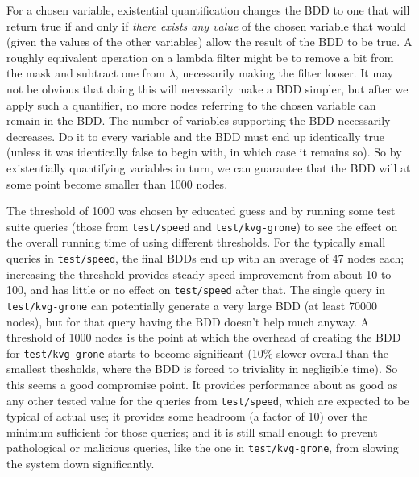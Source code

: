 \documentclass[twocolumn]{report}
\begin{document}
For a chosen variable, existential quantification changes the BDD to one
that will return true if and only if \emph{there exists any value} of the
chosen variable that would (given the values of the other variables) allow
the result of the BDD to be true.  A roughly equivalent operation on a
lambda filter might be to remove a bit from the mask and subtract one from
$\lambda$, necessarily making the filter looser.  It may not be obvious that
doing this will necessarily make a BDD simpler, but after we apply such a
quantifier, no more nodes referring to the chosen variable can remain in the
BDD.  The number of variables supporting the BDD necessarily decreases.  Do
it to every variable and the BDD must end up identically true (unless it was
identically false to begin with, in which case it remains so).  So by
existentially quantifying variables in turn, we can guarantee that the BDD
will at some point become smaller than 1000 nodes.

The threshold of 1000 was chosen by educated guess and by running some test
suite queries (those from \texttt{test/speed} and \texttt{test/kvg-grone})
to see the effect on the overall running time of using different thresholds. 
For the typically small queries in \texttt{test/speed}, the final BDDs end
up with an average of 47 nodes each; increasing the threshold provides
steady speed improvement from about 10 to 100, and has little or no effect
on \texttt{test/speed} after that.  The single query in
\texttt{test/kvg-grone} can potentially generate a very large BDD (at least
70000 nodes), but for that query having the BDD doesn't help much anyway.  A
threshold of 1000 nodes is the point at which the overhead of creating the
BDD for \texttt{test/kvg-grone} starts to become significant (10\% slower
overall than the smallest thesholds, where the BDD is forced to triviality
in negligible time).  So this seems a good compromise point.  It provides
performance about as good as any other tested value for the queries from
\texttt{test/speed}, which are expected to be typical of actual use; it
provides some headroom (a factor of 10) over the minimum sufficient for
those queries; and it is still small enough to prevent pathological or
malicious queries, like the one in \texttt{test/kvg-grone}, from slowing the
system down significantly.
\end{document}
